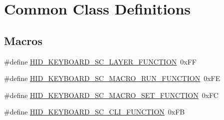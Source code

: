 \hypertarget{group__Group__USBClassHIDCommon}{}\section{Common Class Definitions}
\label{group__Group__USBClassHIDCommon}
\subsection*{Macros}
\begin{DoxyCompactItemize}
\item 
\#define \hyperlink{group__Group__USBClassHIDCommon_ga77dd37d8cdf42a1000250a4ee4e638d0}{H\+I\+D\+\_\+\+K\+E\+Y\+B\+O\+A\+R\+D\+\_\+\+S\+C\+\_\+\+L\+A\+Y\+E\+R\+\_\+\+F\+U\+N\+C\+T\+I\+ON}~0x\+FF
\item 
\#define \hyperlink{group__Group__USBClassHIDCommon_gaee404f5dd05f3ed141c94c3e89655fa6}{H\+I\+D\+\_\+\+K\+E\+Y\+B\+O\+A\+R\+D\+\_\+\+S\+C\+\_\+\+M\+A\+C\+R\+O\+\_\+\+R\+U\+N\+\_\+\+F\+U\+N\+C\+T\+I\+ON}~0x\+FE
\item 
\#define \hyperlink{group__Group__USBClassHIDCommon_ga1ea55f6e63c00188c75055e4263f0785}{H\+I\+D\+\_\+\+K\+E\+Y\+B\+O\+A\+R\+D\+\_\+\+S\+C\+\_\+\+M\+A\+C\+R\+O\+\_\+\+S\+E\+T\+\_\+\+F\+U\+N\+C\+T\+I\+ON}~0x\+FC
\item 
\#define \hyperlink{group__Group__USBClassHIDCommon_ga4ee98cc165bc430b9716694ad87f570a}{H\+I\+D\+\_\+\+K\+E\+Y\+B\+O\+A\+R\+D\+\_\+\+S\+C\+\_\+\+C\+L\+I\+\_\+\+F\+U\+N\+C\+T\+I\+ON}~0x\+FB
\end{DoxyCompactItemize}
